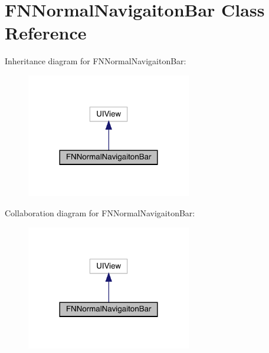\hypertarget{interface_f_n_normal_navigaiton_bar}{}\section{F\+N\+Normal\+Navigaiton\+Bar Class Reference}
\label{interface_f_n_normal_navigaiton_bar}


Inheritance diagram for F\+N\+Normal\+Navigaiton\+Bar\+:\nopagebreak
\begin{figure}[H]
\begin{center}
\leavevmode
\includegraphics[width=204pt]{interface_f_n_normal_navigaiton_bar__inherit__graph}
\end{center}
\end{figure}


Collaboration diagram for F\+N\+Normal\+Navigaiton\+Bar\+:\nopagebreak
\begin{figure}[H]
\begin{center}
\leavevmode
\includegraphics[width=204pt]{interface_f_n_normal_navigaiton_bar__coll__graph}
\end{center}
\end{figure}

